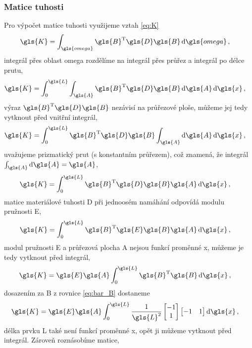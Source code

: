 \subsubsection*{Matice tuhosti}
Pro výpočet matice tuhosti využijeme vztah \ref{eq:K}
\begin{align*}
    \gls{K} &= \int_{\gls{omega}} \gls{B}^{\mathrm{T}}\gls{D}\gls{B} \dd{\gls{omega}},
\end{align*}
integrál přes oblast \gls{omega} rozdělíme na integrál přes průřez a integrál po délce prutu,
\begin{align*}
    \gls{K}  &= \int_{0}^{\gls{L}} \int_{\gls{A}} \gls{B}^{\mathrm{T}}\gls{D}\gls{B} \dd{\gls{A}} \dd{\gls{x}},
\end{align*}
výraz $\gls{B}^{\mathrm{T}}\gls{D}\gls{B}$ nezávisí na průřezové ploše, můžeme jej tedy vytknout před vnitřní integrál,
\begin{align*}
    \gls{K}  &= \int_{0}^{\gls{L}} \gls{B}^{\mathrm{T}}\gls{D}\gls{B} \int_{\gls{A}} \dd{\gls{A}} \dd{\gls{x}},
\end{align*}
uvažujeme prizmatický prut (s konstantním průřezem), což znamená, že integrál $\int_{\gls{A}}\dd{\gls{A}} = \gls{A}$,
\begin{align*}
    \gls{K} &=\int_{0}^{\gls{L}} \gls{B}^{\mathrm{T}}\gls{D}\gls{B} \gls{A} \dd{\gls{x}},
\end{align*}
matice materiálové tuhosti \gls{D} při jednoosém namáhání odpovídá modulu pružnosti \gls{E},
\begin{align*}
    \gls{K} &=\int_{0}^{\gls{L}} \gls{B}^{\mathrm{T}}\gls{E}\gls{B} \gls{A} \dd{\gls{x}},
\end{align*}
modul pružnosti \gls{E} a průřezová plocha \gls{A} nejsou funkcí proměnné \gls{x}, můžeme je tedy vytknout před integrál,
\begin{align*}
    \gls{K} &= \gls{E} \gls{A} \int_{0}^{\gls{L}} \gls{B}^{\mathrm{T}}\gls{B} \dd{\gls{x}},
\end{align*}
dosazením za \gls{B} z rovnice \ref{eq:bar_B} dostaneme
\begin{align*}
    \gls{K} &= \gls{E} \gls{A} \int_{0}^{\gls{L}} \frac{1}{\gls{L}^2} 
    \begin{bmatrix} -1 \\ 1 \end{bmatrix}
    \begin{bmatrix} -1 & 1 \end{bmatrix} \dd{\gls{x}},
\end{align*}
délka prvku \gls{L} také není funkcí proměnné \gls{x}, opět ji můžeme vytknout před integrál. Zároveň roznásobíme matice,
